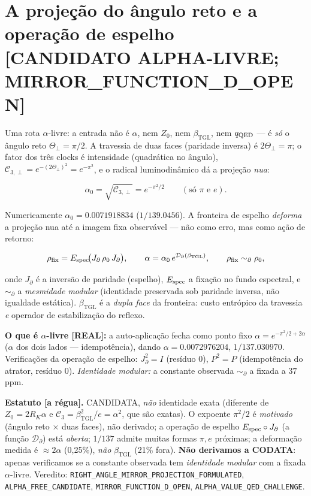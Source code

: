 \documentclass[11pt]{article}
\newcommand{\bTGL}{\beta_{\mathrm{TGL}}}\newcommand{\Msun}{M_{\odot}}\newcommand{\TGL}{\mathrm{TGL}}
\theoremstyle{definition}\newtheorem{deriv}{Derivação}
\begin{document}
\section{A projeção do ângulo reto e a operação de espelho \textsf{[CANDIDATO ALPHA-LIVRE; MIRROR\_FUNCTION\_D\_OPEN]}}

Uma rota $\alpha$-livre: a entrada não é $\alpha$, nem $Z_0$, nem $\bTGL$, nem $q_{\rm QED}$ --- é \emph{só} o ângulo reto $\Theta_\perp=\pi/2$. A travessia de duas faces (paridade inversa) é $2\Theta_\perp=\pi$; o fator dos três clocks é intensidade (quadrática no ângulo), $\mathcal C_{3,\perp}=e^{-(2\Theta_\perp)^2}=e^{-\pi^2}$, e o radical luminodinâmico dá a projeção \emph{nua}:

\begin{equation} \alpha_0=\sqrt{\mathcal C_{3,\perp}}=e^{-\pi^2/2}\qquad(\text{só }\pi\text{ e }e).\end{equation}

Numericamente $\alpha_0=0.0071918834$ ($1/139.0456$). A fronteira de espelho \emph{deforma} a projeção nua até a imagem fixa observável --- não como erro, mas como ação de retorno:

\begin{equation} \rho_{\rm fix}=E_{\rm spec}\!\big(J_\partial\,\rho_0\,J_\partial\big),\qquad \alpha=\alpha_0\,e^{\mathcal D_\partial(\bTGL)},\qquad \rho_{\rm fix}\sim_\partial\rho_0,\end{equation}

onde $J_\partial$ é a inversão de paridade (espelho), $E_{\rm spec}$ a fixação no fundo espectral, e $\sim_\partial$ a \emph{mesmidade modular} (identidade preservada sob paridade inversa, não igualdade estática). $\bTGL$ é a \emph{dupla face} da fronteira: custo entrópico da travessia \emph{e} operador de estabilização do reflexo.

\textbf{O que é $\alpha$-livre \textsf{[REAL]}:} a auto-aplicação fecha como ponto fixo $\alpha=e^{-\pi^2/2+2\alpha}$ ($\alpha$ dos dois lados --- idempotência), dando $\alpha=0.0072976204$, $1/137.030970$. Verificações da operação de espelho: $J_\partial^2=I$ (resíduo $0$), $P^2=P$ (idempotência do atrator, resíduo $0$). \emph{Identidade modular:} a constante observada $\sim_\partial$ a fixada a $37$ ppm.

\textbf{Estatuto \textsf{[a régua]}.} CANDIDATA, \emph{não} identidade exata (diferente de $Z_0=2R_K\alpha$ e $\mathcal C_3=\bTGL^2/e=\alpha^2$, que são exatas). O expoente $\pi^2/2$ é \emph{motivado} (ângulo reto $\times$ duas faces), não derivado; a operação de espelho $E_{\rm spec}\circ J_\partial$ (a função $\mathcal D_\partial$) está \emph{aberta}; $1/137$ admite muitas formas $\pi,e$ próximas; a deformação medida é $\approx 2\alpha$ (0,25\%), \emph{não} $\bTGL$ (21\% fora). \textbf{Não derivamos a CODATA}: apenas verificamos se a constante observada tem \emph{identidade modular} com a fixada $\alpha$-livre. Veredito: \texttt{RIGHT\_ANGLE\_MIRROR\_PROJECTION\_FORMULATED}, \texttt{ALPHA\_FREE\_CANDIDATE}, \texttt{MIRROR\_FUNCTION\_D\_OPEN}, \texttt{ALPHA\_VALUE\_QED\_CHALLENGE}.
\end{document}
